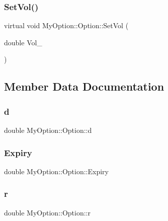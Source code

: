 \subsubsection{\texorpdfstring{Set\+Vol()}{SetVol()}}
{\footnotesize\ttfamily virtual void My\+Option\+::\+Option\+::\+Set\+Vol (\begin{DoxyParamCaption}\item[{double}]{Vol\+\_\+ }\end{DoxyParamCaption})\hspace{0.3cm}{\ttfamily [virtual]}}



\subsection{Member Data Documentation}
\hypertarget{classMyOption_1_1Option_a500979f4b32262594d895c4a83b58d1d}{}\label{classMyOption_1_1Option_a500979f4b32262594d895c4a83b58d1d} 
\subsubsection{\texorpdfstring{d}{d}}
{\footnotesize\ttfamily double My\+Option\+::\+Option\+::d\hspace{0.3cm}{\ttfamily [protected]}}

\hypertarget{classMyOption_1_1Option_ac1adacb417fede41d151b9cda05bcb3d}{}\label{classMyOption_1_1Option_ac1adacb417fede41d151b9cda05bcb3d} 
\subsubsection{\texorpdfstring{Expiry}{Expiry}}
{\footnotesize\ttfamily double My\+Option\+::\+Option\+::\+Expiry\hspace{0.3cm}{\ttfamily [protected]}}

\hypertarget{classMyOption_1_1Option_aa8cb250427dece65ea49255d4102cc8d}{}\label{classMyOption_1_1Option_aa8cb250427dece65ea49255d4102cc8d} 
\subsubsection{\texorpdfstring{r}{r}}
{\footnotesize\ttfamily double My\+Option\+::\+Option\+::r\hspace{0.3cm}{\ttfamily [protected]}}


